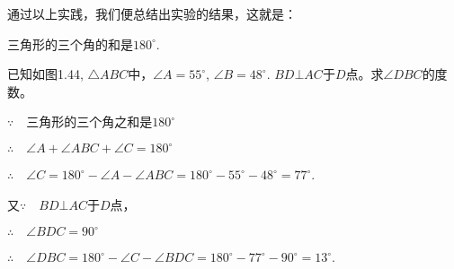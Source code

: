 通过以上实践，我们便总结出实验的结果，这就是：

\begin{blk}{}
三角形的三个角的和是$180^{\circ}$.	
\end{blk}

\begin{example}
	已知如图1.44, $\triangle ABC$中，$\angle A=55^{\circ}$, $\angle B=48^{\circ}$. 
$BD\bot AC$于$D$点。求$\angle DBC$的度数。
\end{example}

\begin{figure}[htp]
	\centering
{}
	\caption{}
\end{figure}

\begin{solution}
$\because\quad $三角形的三个角之和是$180^{\circ}$

$\therefore\quad \angle A+\angle ABC+\angle C=180^{\circ}$

$\therefore\quad \angle C=180^{\circ}-\angle A-\angle ABC
=180^{\circ}-55^{\circ}-48^{\circ}=77^{\circ}$.

又$\because\quad BD\bot AC$于$D$点，

$\therefore\quad \angle BDC=90^{\circ}$

$\therefore\quad \angle DBC=180^{\circ}-\angle C-\angle BDC
=180^{\circ}-77^{\circ}-90^{\circ}=13^{\circ}$.
\end{solution}

